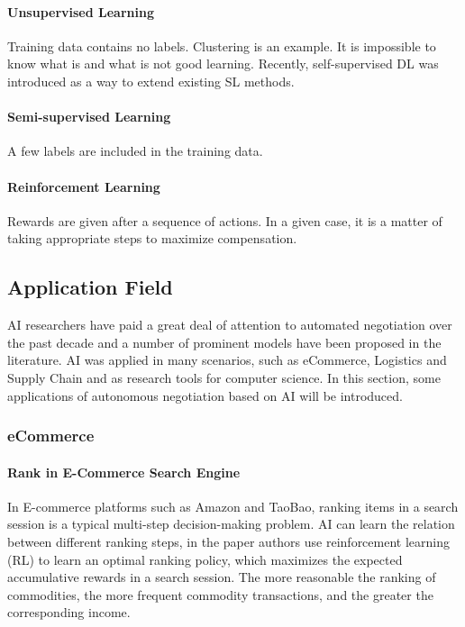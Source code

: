 \paragraph{Unsupervised Learning} 
Training data contains no labels. Clustering is an example. It is impossible to know what is and what is not good learning. Recently, self-supervised DL was introduced as a way to extend existing SL methods\parencite{caron2021emerging}.

\paragraph{Semi-supervised Learning}
A few labels are included in the training data.
\paragraph{Reinforcement Learning}
Rewards are given after a sequence of actions. In a given case, it is a matter of taking appropriate steps to maximize compensation.

\subsection{Application Field}
AI researchers have paid a great deal of attention to automated negotiation over the past decade and a number of prominent models have been proposed in the literature. AI was applied in many scenarios, such as eCommerce, Logistics and Supply Chain and as research tools for computer science. In this section, some applications of autonomous negotiation based on AI will be introduced.

\subsubsection{eCommerce}
\paragraph{Rank in E-Commerce Search Engine} In E-commerce platforms such as Amazon and TaoBao, ranking items in a search session is a typical multi-step decision-making problem. AI can learn the relation between different ranking steps, in the paper
\parencite{Hu2018} authors use reinforcement learning (RL) to learn an optimal ranking policy, which maximizes the expected accumulative rewards in a search session. The more reasonable the ranking of commodities, the more frequent commodity transactions, and the greater the corresponding income.

